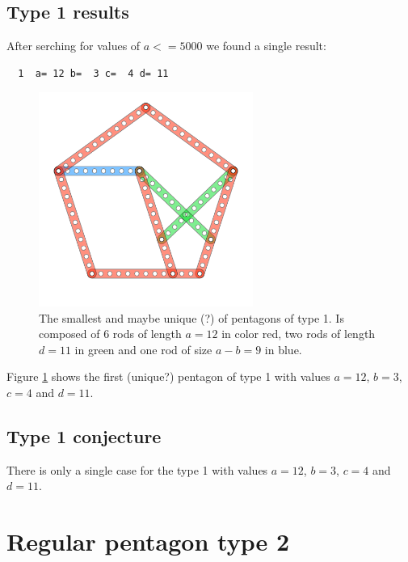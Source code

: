 \documentclass[11pt]{article}
\begin{document}
\subsection{Type 1 results}
After serching for values of $a <= 5000$ we found a single result:

\begin{lstlisting}
  1  a= 12 b=  3 c=  4 d= 11
\end{lstlisting}

\begin{figure}
\centering
\includegraphics[width=7cm]{figs/pentagon-12a}
\caption{The smallest and maybe unique (?) of pentagons of type 1.
Is composed of 6 rods of length $a = 12$ in color red,
two rods of length $d=11$ in green and one rod of size $a-b = 9$ in blue.}
\label{pentagon-12a}
\end{figure}

Figure \ref{pentagon-12a} shows the first (unique?) pentagon of type 1 with values
$a=12$, $b=3$, $c=4$ and $d=11$.

\subsection{Type 1 conjecture}
There is only a single case for the type 1 with values $a=12$, $b=3$, $c=4$ and $d=11$.

\vspace{100em}

\section{Regular pentagon type 2}
\end{document}
